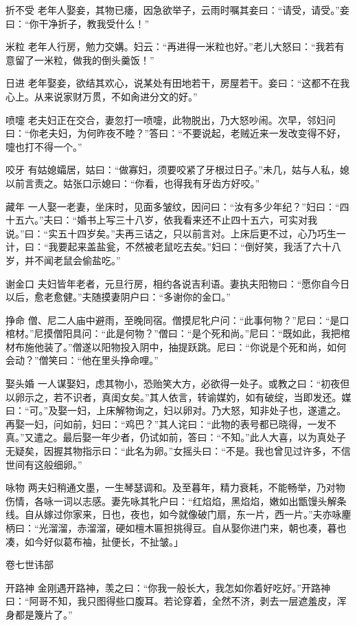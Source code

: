 \documentclass[12pt,UTF8]{ctexbook}
\begin{document}
折不受
老年人娶妾，其物已痿，因急欲举子，云雨时嘱其妾曰：“请受，请受。”妾曰：“你干净折子，教我受什么！”

米粒
老年人行房，勉力交媾。妇云：“再进得一米粒也好。”老儿大怒曰：“我若有意留了一米粒，做我的倒头羹饭！”

日进
老年娶妾，欲结其欢心，说某处有田地若干，房屋若干。妾曰：“这都不在我心上。从来说家财万贯，不如肏进分文的好。”

喷嚏
老夫妇正在交合，妻忽打一喷嚏，此物脱出，乃大怒吵闹。次早，邻妇问曰：“你老夫妇，为何昨夜不睦？”答曰：“不要说起，老贼近来一发改变得不好，嚏也打不得一个。”

咬牙
有姑媳孀居，姑曰：“做寡妇，须要咬紧了牙根过日子。”未几，姑与人私，媳以前言责之。姑张口示媳曰：“你看，也得我有牙齿方好咬。”

藏年
一人娶一老妻，坐床时，见面多皱纹，因问曰：“汝有多少年纪？”妇曰：“四十五六。”夫曰：“婚书上写三十八岁，依我看来还不止四十五六，可实对我说。”曰：“实五十四岁矣。”夫再三诘之，只以前言对。上床后更不过，心乃巧生一计，曰：“我要起来盖盐瓮，不然被老鼠吃去矣。”妇曰：“倒好笑，我活了六十八岁，并不闻老鼠会偷盐吃。”

谢金口
夫妇皆年老者，元旦行房，相约各说吉利语。妻执夫阳物曰：“愿你自今日以后，愈老愈健。”夫随摸妻阴户曰：“多谢你的金口。”

挣命
僧、尼二人庙中避雨，至晚同宿。僧摸尼牝户问：“此事何物？”尼曰：“是口棺材。”尼摸僧阳具问：“此是何物？”僧曰：“是个死和尚。”尼曰：“既如此，我把棺材布施他装了。”僧遂以阳物投入阴中，抽提跃跳。尼曰：“你说是个死和尚，如何会动？”僧笑曰：“他在里头挣命哩。”

娶头婚
一人谋娶妇，虑其物小，恐贻笑大方，必欲得一处子。或教之曰：“初夜但以卵示之，若不识者，真闺女矣。”其人依言，转谕媒妁，如有破绽，当即发还。媒曰：“可。”及娶一妇，上床解物询之，妇以卵对。乃大怒，知非处子也，遂遣之。再娶一妇，问如前，妇曰：“鸡巴？”其人诧曰：“此物的表号都已晓得，一发不真。”又遣之。最后娶一年少者，仍试如前，答曰：“不知。”此人大喜，以为真处子无疑矣，因握其物指示曰：“此名为卵。”女摇头曰：“不是。我也曾见过许多，不信世间有这般细卵。”

咏物
两夫妇稍通文墨，一生琴瑟调和。及至暮年，精力衰耗，不能畅举，乃对物伤情，各咏一词以志感。妻先咏其牝户曰：“红焰焰，黑焰焰，嫩如出甑馒头解条线。自从嫁过你家来，日也，夜也，如今就像破门扇，东一片，西一片。”夫亦咏麈柄曰：“光溜溜，赤溜溜，硬如檀木匾担挑得豆。自从娶你进门来，朝也凑，暮也凑，如今好似葛布袖，扯便长，不扯皱。」

卷七世讳部

开路神
金刚遇开路神，羡之曰：“你我一般长大，我怎如你着好吃好。”开路神曰：“阿哥不知，我只图得些口腹耳。若论穿着，全然不济，剥去一层遮羞皮，浑身都是篾片了。”
\end{document}
